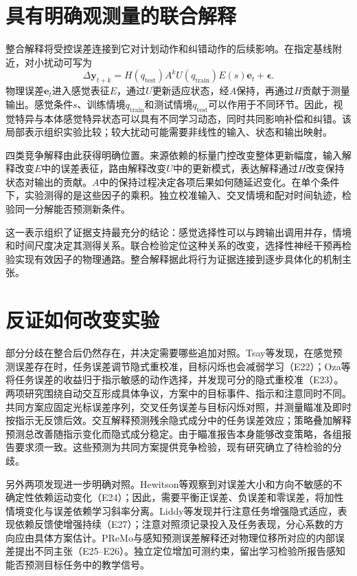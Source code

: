 \documentclass[11pt,a4paper]{article}
\begin{document}
\section{具有明确观测量的联合解释}
整合解释将受控误差连接到它对计划动作和纠错动作的后续影响。在指定基线附近，对小扰动可写为
\begin{equation}\Delta\mathbf y_{t+k}=H(q_{\mathrm{test}})A^kU(q_{\mathrm{train}})E(s)\mathbf e_t+\boldsymbol\epsilon.\label{eq:factor}\end{equation}
物理误差$\mathbf e_t$进入感觉表征$E$，通过$U$更新适应状态，经$A$保持，再通过$H$贡献于测量输出。感觉条件$s$、训练情境$q_{\mathrm{train}}$和测试情境$q_{\mathrm{test}}$可以作用于不同环节。因此，视觉特异与本体感觉特异状态可以具有不同学习动态，同时共同影响补偿和纠错。该局部表示组织实验比较；较大扰动可能需要非线性的输入、状态和输出映射。

四类竞争解释由此获得明确位置。来源依赖的标量门控改变整体更新幅度，输入解释改变$E$中的误差表征，路由解释改变$U$中的更新模式，表达解释通过$H$改变保持状态对输出的贡献。$A$中的保持过程决定各项后果如何随延迟变化。在单个条件下，实验测得的是这些因子的乘积。独立校准输入、交叉情境和配对时间轨迹，检验同一分解能否预测新条件。

这一表示组织了证据支持最充分的结论：感觉选择性可以与跨输出调用并存，情境和时间尺度决定其测得关系。联合检验定位这种关系的改变，选择性神经干预再检验实现有效因子的物理通路。整合解释据此将行为证据连接到逐步具体化的机制主张。

\section{反证如何改变实验}
部分分歧在整合后仍然存在，并决定需要哪些追加对照。Tsay等发现，在感觉预测误差存在时，任务误差调节隐式重校准，目标闪烁也会减弱学习（E22）；Oza等将任务误差的收益归于指示敏感的动作选择，并发现可分的隐式重校准（E23）。两项研究围绕自动交互形成具体争议，方案中的目标事件、指示和注意同时不同。共同方案应固定光标误差序列，交叉任务误差与目标闪烁对照，并测量瞄准及即时按指示无反馈后效。交互解释预测残余隐式成分中的任务误差效应；策略叠加解释预测总改善随指示变化而隐式成分稳定。由于瞄准报告本身能够改变策略，各组报告要求须一致。这些预测为共同方案提供竞争检验，现有研究确立了待检验的分歧。\cite{tsay2022,oza2024}

另外两项发现进一步明确对照。Hewitson等观察到对误差大小和方向不敏感的不确定性依赖运动变化（E24）；因此，需要平衡正误差、负误差和零误差，将加性情境变化与误差依赖学习斜率分离。Liddy等发现并行注意任务增强隐式适应，表现依赖反馈使增强持续（E27）；注意对照须记录投入及任务表现，分心系数的方向应由具体方案估计。PReMo与感知预测误差解释还对物理位移所对应的内部误差提出不同主张（E25--E26）。独立定位增加可测约束，留出学习检验所报告感知能否预测目标任务中的教学信号。\cite{uncertain2023,attention2026,premo2022,percept2026}
\end{document}
